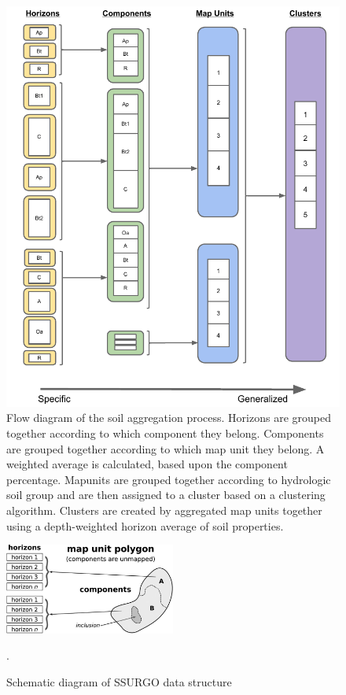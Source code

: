 \begin{figure}
	\centering
	\includegraphics[width=\textwidth]{./img/aggregation_flow_diagram}
	\caption[Flow diagram of the soil aggregation process]{Flow diagram of the soil aggregation process. Horizons are grouped together according to which component they belong. Components are grouped together according to which map unit they  belong. A weighted average is calculated, based upon the component percentage. Mapunits are grouped together according to hydrologic soil group  and are then assigned to a cluster based on a clustering algorithm. Clusters are created by aggregated map units together using a depth-weighted horizon average of soil properties.}
	\label{fig:agg_flow_diagram}
\end{figure}

\begin{figure}[h]
\centering
 \includegraphics[width=0.5\textwidth]{./img/ssurgo_data_structure_schematic.jpeg}
	\caption[Schematic diagram of SSURGO data structure]{Schematic diagram of SSURGO data structure \cite{gatzke_aggregation_2011}}.
	\label{fig:ssurgo_schematic}
\end{figure}


